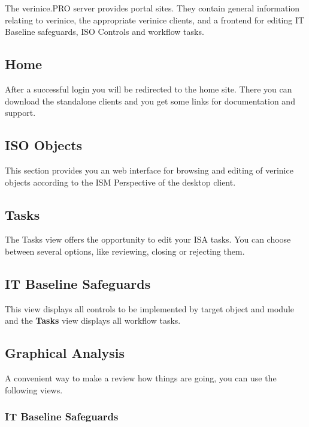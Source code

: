 \documentclass[a4paper,10pt]{book}
\begin{document}
The verinice.\textsc{PRO} server provides portal sites. They contain
general information relating to verinice, the appropriate verinice
clients, and a frontend for editing IT Baseline safeguards, ISO
Controls and workflow tasks.

\subsection{Home}
\label{sec:home}

After a successful login you will be redirected to the home
site. There you can download the standalone clients and you get some
links for documentation and support.

\subsection{ISO Objects}
\label{sec:iso-objects}

This section provides you an web interface for browsing and editing of
verinice objects according to the ISM Perspective of the desktop
client.


\subsection{Tasks}
\label{sec:tasks}

The Tasks view offers the opportunity to edit your ISA tasks. You can
choose between several options, like reviewing, closing or rejecting
them.

\subsection{IT Baseline Safeguards}
\label{sec:it-baseline-safeguards}

This view displays all controls to be implemented by target object and
module and the \textbf{Tasks} view displays all workflow tasks.

\subsection{Graphical Analysis}
\label{sec:graphical-analysis}

A convenient way to make a review how things are going, you can use
the following views.

\subsubsection{IT Baseline Safeguards}
\label{sec:it-baseline-safeguards-charts}
\end{document}
